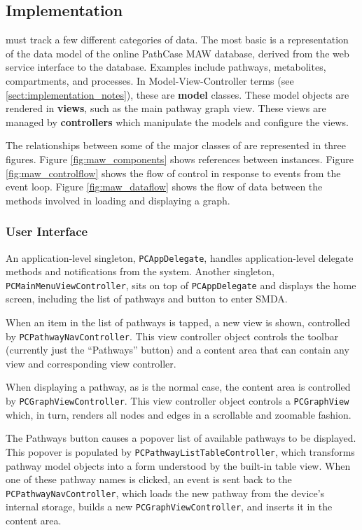 \subsection{Implementation}
\label{sect:maw_implementation}

\mawapp must track a few different categories of data. The most
basic is a representation of the data model of the online PathCase MAW database,
derived from the web service interface to the database. Examples include
pathways, metabolites, compartments, and processes. In Model-View-Controller
terms (see \ref{sect:implementation_notes}), these are \textbf{model} classes.
These model objects are rendered in \textbf{views}, such as the main pathway
graph view.  These views are managed by \textbf{controllers} which manipulate
the models and configure the views.

The relationships between some of the major classes of \mawapp are represented
in three figures. Figure \ref{fig:maw_components} shows references between
instances. Figure \ref{fig:maw_controlflow} shows the flow of control in
response to events from the event loop. Figure \ref{fig:maw_dataflow} shows the
flow of data between the methods involved in loading and displaying a graph.

\subsubsection{User Interface}
\label{sect:maw_ui}

An application-level singleton, \texttt{PCAppDelegate}, handles
application-level delegate methods and notifications from the system. Another
singleton, \texttt{PCMainMenuViewController}, sits on top of
\texttt{PCAppDelegate} and displays the home screen, including the list of
pathways and button to enter SMDA.

When an item in the list of pathways is tapped, a new view is shown, controlled
by \texttt{PCPathwayNavController}. This view controller object controls the
toolbar (currently just the ``Pathways'' button) and a content area that can
contain any view and corresponding view controller.

When displaying a pathway, as is the normal case, the content area is controlled
by \texttt{PCGraphViewController}. This view controller object controls a
\texttt{PCGraphView} which, in turn, renders all nodes and edges in a scrollable
and zoomable fashion.

The Pathways button causes a popover list of available pathways to be displayed.
This popover is populated by \texttt{PCPathwayListTableController}, which
transforms pathway model objects into a form understood by the built-in table
view. When one of these pathway names is clicked, an event is sent back to the
\texttt{PCPathwayNavController}, which loads the new pathway from the device's
internal storage, builds a new \texttt{PCGraphViewController}, and inserts it in
the content area.

